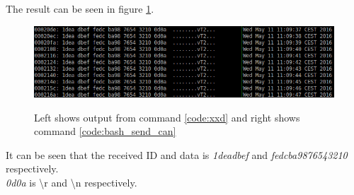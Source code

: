 The result can be seen in figure \ref{fig:can_recv_output}.
\begin{figure}[H]
    \center
    \includegraphics[width=1\textwidth]{graphics/xdd_can_test.png}
  \label{fig:can_recv_output}
  \caption{Left shows output from command \ref{code:xxd} and right shows command \ref{code:bash_send_can}}
\end{figure}
It can be seen that the received ID and data is \textit{1deadbef} and \textit{fedcba9876543210} respectively.\\
\textit{0d0a} is \textbackslash r and \textbackslash n respectively.


